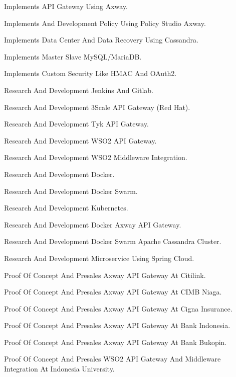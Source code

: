 \documentclass[english]{cv-style}
\begin{document}
\begin{entrylist}
{\begin{itemize}
{    \item Implements API Gateway Using Axway.
    \item Implements And Development Policy Using Policy Studio Axway.
    \item Implements Data Center And Data Recovery Using Cassandra.
    \item Implements Master Slave MySQL/MariaDB.
    \item Implements Custom Security Like HMAC And OAuth2.
    \item Research And Development Jenkins And Gitlab.
    \item Research And Development 3Scale API Gateway (Red Hat).
    \item Research And Development Tyk API Gateway.
    \item Research And Development WSO2 API Gateway.
    \item Research And Development WSO2 Middleware Integration.
    \item Research And Development Docker.
    \item Research And Development Docker Swarm.
    \item Research And Development Kubernetes.
    \item Research And Development Docker Axway API Gateway.
    \item Research And Development Docker Swarm Apache Cassandra Cluster.
    \item Research And Development Microservice Using Spring Cloud.
    \item Proof Of Concept And Presales Axway API Gateway At Citilink.
    \item Proof Of Concept And Presales Axway API Gateway At CIMB Niaga.
    \item Proof Of Concept And Presales Axway API Gateway At Cigna Insurance.
    \item Proof Of Concept And Presales Axway API Gateway At Bank Indonesia.
    \item Proof Of Concept And Presales Axway API Gateway At Bank Bukopin.
    \item Proof Of Concept And Presales WSO2 API Gateway And Middleware Integration At Indonesia University.}
  \end{itemize}}
\end{entrylist}
\end{document}
